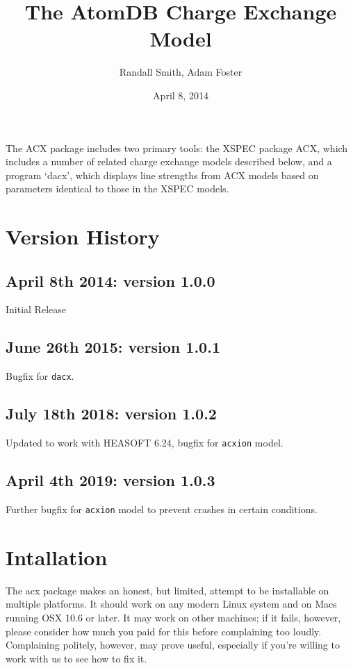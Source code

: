 \documentclass[11pt]{article}
\title{The AtomDB Charge Exchange Model}
\author{Randall Smith, Adam Foster}
\date{April 8, 2014}
\begin{document}
\maketitle

The ACX package includes two primary tools: the XSPEC package ACX, which
includes a number of related charge exchange models described below,
and a program `dacx', which displays line strengths from ACX models
based on parameters identical to those in the XSPEC models.  

\section*{Version History}
\subsection*{April 8th 2014: version 1.0.0}
Initial Release
\subsection*{June 26th 2015: version 1.0.1}
Bugfix for \texttt{dacx}.
\subsection*{July 18th 2018: version 1.0.2}
Updated to work with HEASOFT 6.24, bugfix for \texttt{acxion} model.
\subsection*{April 4th 2019: version 1.0.3}
Further bugfix for \texttt{acxion} model to prevent crashes in certain conditions.


\section*{Intallation}

The acx package makes an honest, but limited, attempt to be installable
on multiple platforms.  It should work on any modern Linux system and
on Macs running OSX 10.6 or later.  It may work on other machines; if
it fails, however, please consider how much you paid for this before
complaining too loudly.  Complaining politely, however, may prove
useful, especially if you're willing to work with us to see how to fix
it.
\end{document}
